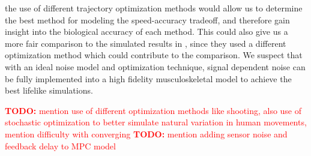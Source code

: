 \documentclass[letterpaper, 10pt, conference]{ieeeconf}
\newcommand{\todo}[1]{\textcolor{red}{\textbf{TODO:} #1}}
\begin{document}
the use of different trajectory optimization methods would allow us to determine the best method for modeling the speed-accuracy tradeoff, and therefore gain insight into the biological accuracy of each method. This could also give us a more fair comparison to the simulated results in \cite{original_paper_high_fidelity}, since they used a different optimization method which could contribute to the comparison. We suspect that with an ideal noise model and optimization technique, signal dependent noise can be fully implemented into a high fidelity musculoskeletal model to achieve the best lifelike simulations.

\todo{mention use of different optimization methods like shooting, also use of stochastic optimization to better simulate natural variation in human movements, mention difficulty with converging}
\todo{mention adding sensor noise and feedback delay to MPC model}
\end{document}
